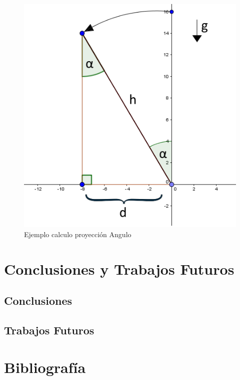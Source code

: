 \documentclass[12pt,a4paper]{article}
\begin{document}
  \begin{figure}[H]
  \centering
      \includegraphics[scale=0.5]{images/calculoProyeccion}
      \caption{Ejemplo calculo proyección Angulo}
      \label{fig:proyeccion}
  \end{figure}

\section{Conclusiones y Trabajos Futuros}
\subsection{Conclusiones}
\subsection{Trabajos Futuros}

\section{Bibliografía}

\printbibliography[heading=none]%

\thispagestyle{empty}
\pagebreak
\newpage
\end{document}
